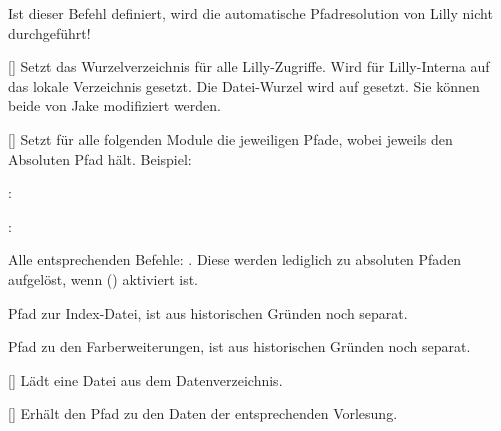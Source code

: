 %
%
%

Ist dieser Befehl definiert, wird die automatische Pfadresolution von Lilly nicht durchgeführt!

%
%
%

[\cmdlist{}]
Setzt das Wurzelverzeichnis für alle Lilly-Zugriffe. Wird für Lilly-Interna auf das lokale Verzeichnis gesetzt. Die Datei-Wurzel wird auf \T{\LILLYxPATHxFILExROOT} gesetzt. Sie können beide von Jake modifiziert werden.

%
%
%

[\cmdlist{}]
Setzt für alle folgenden Module die jeweiligen Pfade, wobei  jeweils den Absoluten Pfad hält. Beispiel:
\begin{ditemize}\narrowitems
    \item {}: \newline\lstshowcmd{\LILLYxPATHxGRAPHICS}
    \item {}: \newline\lstshowcmd{\LILLYxABSPATHxGRAPHICS}
\end{ditemize}\def\stdloperation#1{\blankcmd{LILLYxPATHx#1} (\blankcmd{LILLYxABSPATHx#1})\anothercmd*[1.0.4]{LILLYxPATHx#1}\anothercmd*[1.0.4]{LILLYxABSPATHx#1}}
Alle entsprechenden Befehle: . Diese werden lediglich zu absoluten Pfaden aufgelöst, wenn  () aktiviert ist.

%
%
%

Pfad zur Index-Datei, ist aus historischen Gründen noch separat.

%
%
%

Pfad zu den Farberweiterungen, ist aus historischen Gründen noch separat.

%
%
%

[]
Lädt eine Datei aus dem Datenverzeichnis.

%
%
%

[]
Erhält den Pfad zu den Daten der entsprechenden Vorlesung.

%
%
%

